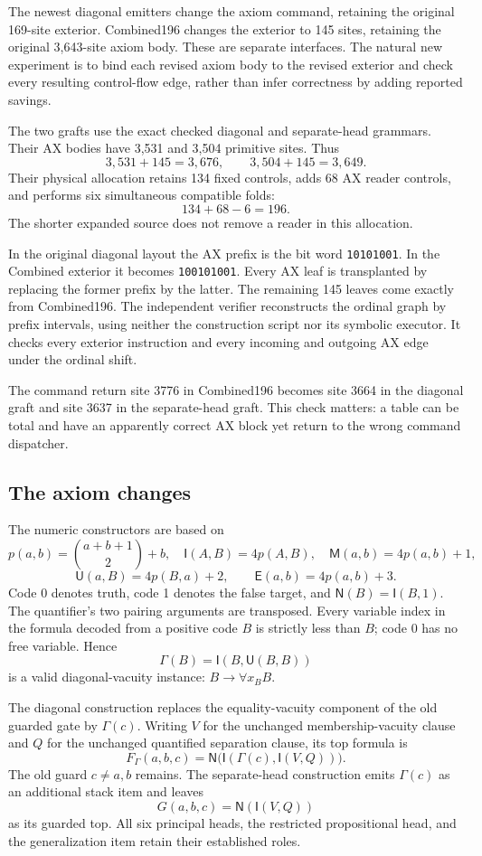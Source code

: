 \documentclass[11pt,letterpaper]{article}
\newcommand{\file}[1]{\texttt{\nolinkurl{#1}}}
\newcommand{\I}{\mathsf I}
\newcommand{\U}{\mathsf U}
\newcommand{\M}{\mathsf M}
\newcommand{\E}{\mathsf E}
\newcommand{\N}{\mathsf N}
\begin{document}
The newest diagonal emitters change the axiom command, retaining the
original 169-site exterior. Combined196 changes the exterior to 145
sites, retaining the original 3,643-site axiom body. These are separate
interfaces. The natural new experiment is to bind each revised axiom body
to the revised exterior and check every resulting control-flow edge,
rather than infer correctness by adding reported savings.

The two grafts use the exact checked diagonal and separate-head
grammars. Their AX bodies have 3,531 and 3,504 primitive sites. Thus
\[
 3,531+145=3,676,\qquad 3,504+145=3,649.
\]
Their physical allocation retains 134 fixed controls, adds 68 AX reader
controls, and performs six simultaneous compatible folds:
\[
                       134+68-6=196.
\]
The shorter expanded source does not remove a reader in this allocation.

In the original diagonal layout the AX prefix is the bit word
\file{10101001}. In the Combined exterior it becomes
\file{100101001}. Every AX leaf is transplanted by replacing the former
prefix by the latter. The remaining 145 leaves come exactly from
Combined196. The independent verifier reconstructs the ordinal graph by
prefix intervals, using neither the construction script nor its symbolic
executor. It checks every exterior instruction and every incoming and
outgoing AX edge under the ordinal shift.

The command return site 3776 in Combined196 becomes site 3664 in the
diagonal graft and site 3637 in the separate-head graft. This check matters:
a table can be total and have an apparently correct AX block yet return
to the wrong command dispatcher.

\subsection{The axiom changes}

The numeric constructors are based on
\[
 p(a,b)=\binom{a+b+1}{2}+b,
 \quad \I(A,B)=4p(A,B),\quad \M(a,b)=4p(a,b)+1,
\]
\[
 \U(a,B)=4p(B,a)+2,
 \qquad \E(a,b)=4p(a,b)+3.
\]
Code 0 denotes truth, code 1 denotes the false target, and
$\N(B)=\I(B,1)$. The quantifier's two pairing arguments are transposed.
Every variable index in the formula decoded from a positive code $B$ is
strictly less than $B$; code 0 has no free variable. Hence
\[
              \Gamma(B)=\I(B,\U(B,B))
\]
is a valid diagonal-vacuity instance: $B\to\forall x_B B$.

The diagonal construction replaces the equality-vacuity component of
the old guarded gate by $\Gamma(c)$. Writing $V$ for the unchanged
membership-vacuity clause and $Q$ for the unchanged quantified
separation clause, its top formula is
\[
              F_\Gamma(a,b,c)=\N\bigl(\I(\Gamma(c),\I(V,Q))\bigr).
\]
The old guard $c\ne a,b$ remains. The separate-head construction emits
$\Gamma(c)$ as an additional stack item and leaves
\[
                      G(a,b,c)=\N(\I(V,Q))
\]
as its guarded top. All six principal heads, the restricted propositional
head, and the generalization item retain their established roles.
\end{document}

